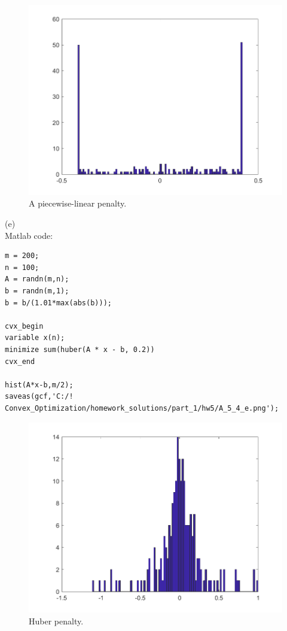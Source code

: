 \documentclass{article}
\begin{document}
\begin{figure}[H]
	\includegraphics[width=\linewidth]{A_5_4_d.png}
	\caption{A piecewise-linear penalty.}
\end{figure}

(e)\\
Matlab code:

\begin{verbatim}
m = 200;
n = 100;
A = randn(m,n);
b = randn(m,1);
b = b/(1.01*max(abs(b)));

cvx_begin
variable x(n);
minimize sum(huber(A * x - b, 0.2))
cvx_end

hist(A*x-b,m/2);
saveas(gcf,'C:/! Convex_Optimization/homework_solutions/part_1/hw5/A_5_4_e.png');
\end{verbatim}

\begin{figure}[H]
	\includegraphics[width=\linewidth]{A_5_4_e.png}
	\caption{Huber penalty.}
\end{figure}
\end{document}
